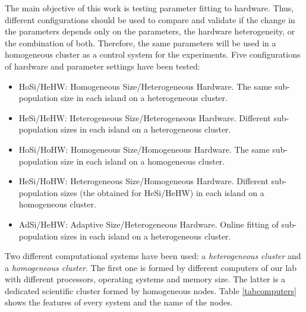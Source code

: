 \documentclass[final,1p,times]{elsarticle}
\begin{document}
The main objective of this work is testing parameter fitting to hardware. Thus, different configurations should be used to compare and validate if the change in the parameters depends only on the parameters, the hardware heterogeneity, or the combination of both. Therefore, the same parameters will be used in a homogeneous cluster as a control system for the experiments.
Five configurations of hardware and parameter settings have been tested:


\begin{itemize}
\item HoSi/HeHW: Homogeneous Size/Heterogeneous Hardware. The same sub-population size in each island on a heterogeneous cluster.
\item HeSi/HeHW: Heterogeneous Size/Heterogeneous Hardware. Different sub-population sizes in each island on a heterogeneous cluster.
\item HoSi/HoHW: Homogeneous Size/Homogeneous Hardware. The same sub-population size in each island on a homogeneous cluster.
\item HeSi/HoHW: Heterogeneous Size/Homogeneous Hardware. Different sub-population sizes (the obtained for HeSi/HeHW) in each island on a homogeneous cluster.

\item AdSi/HeHW: Adaptive Size/Heterogeneous Hardware. Online fitting of sub-population sizes in each island on a heterogeneous cluster.
\end{itemize}

Two different computational systems have been used: a {\em heterogeneous cluster} and a {\em homogeneous cluster}. The first one is formed by different computers of our lab with different processors, operating systems and memory size. The latter is a dedicated scientific cluster formed by homogeneous nodes. Table \ref{tabcomputers} shows the features of every system and the name of the nodes.
\end{document}
